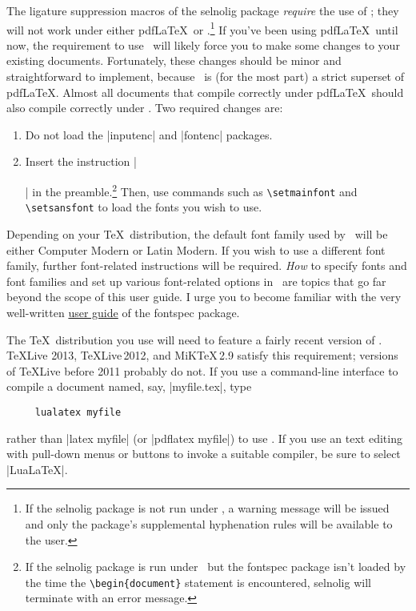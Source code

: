 \documentclass[11pt]{article}
\newcommand{\pkg}[1]{\textsf{#1}}
\newcommand{\cmmd}[1]{\texttt{\textbackslash #1}}
\begin{document}
\begingroup
\renewcommand\theenumi{(\roman{enumi})}
\renewcommand\labelenumi\theenumi

The ligature suppression macros of the \pkg{selnolig} package \emph{require} the use of \LuaLaTeX; they will not work under either pdf\LaTeX\ or \XeLaTeX.\footnote{If the \pkg{selnolig} package is not run under \LuaLaTeX, a warning message will be issued and only the package's supplemental hyphenation rules will be available to the user.}
If you've been using pdf\LaTeX\ until now, the requirement to use \LuaLaTeX\ will likely force you to make some changes to your existing documents. Fortunately, these changes should be minor and straightforward to implement, because \LuaLaTeX\ is (for the most part) a strict superset of pdf\LaTeX. Almost all documents that compile correctly under pdf\LaTeX\ should also compile correctly under \LuaLaTeX. Two required changes are: 
\begin{enumerate}
\item Do not load the |inputenc| and |fontenc| packages. \item Insert the instruction |\usepackage{fontspec}|
in the preamble.\footnote{If the \pkg{selnolig} package is run under \LuaLaTeX\ but the \pkg{fontspec} package isn't loaded by the time the \Verb+\begin{document}+ statement is encountered, \pkg{selnolig} will terminate with an error message.} Then, use commands such as \cmmd{setmainfont} and \cmmd{setsansfont} to load the fonts you wish to use.
\end{enumerate}
\endgroup


Depending on your \TeX\ distribution, the default font family used by \LuaLaTeX\ will be either Computer Modern or Latin Modern. If you wish to use a different font family, further font-related instructions will be required. \emph{How} to specify fonts and font families and set up various font-related options in \LuaLaTeX\ are topics that go far beyond the scope of this user guide. I urge you to become familiar with the very well-written
 \href{http://www.ctan.org/tex-archive/macros/latex/contrib/fontspec/fontspec.pdf}{user guide} of the \pkg{fontspec} package.

The \TeX\ distribution you use will need to feature a fairly recent version of \LuaLaTeX. \TeX Live 2013, \TeX Live\,2012, and MiK\TeX\,2.9 satisfy this requirement; versions of \TeX Live before 2011 probably do not. If you use a command-line interface to compile a document named, say, |myfile.tex|, type 
\begin{Verbatim}
     lualatex myfile
\end{Verbatim}
rather than |latex myfile| (or |pdflatex myfile|) to use \LuaLaTeX. If you use an text editing with pull-down menus or buttons to invoke a suitable compiler, be sure to select |LuaLaTeX|. 
\end{document}
